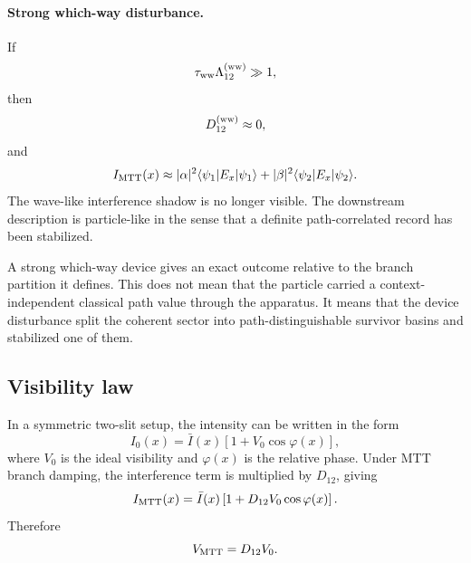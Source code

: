 \documentclass[11pt]{article}
\begin{document}
\paragraph{Strong which-way disturbance.}
If
\begin{equation}
  \tau_{\rm ww}\Lambda_{12}^{(\rm ww)}\gg1,
\end{equation}
then
\begin{equation}
  D_{12}^{(\rm ww)}\approx0,
\end{equation}
and
\begin{equation}
  I_{\rm MTT}(x)
  \approx
  |\alpha|^2\langle\psi_1|E_x|\psi_1\rangle
  +
  |\beta|^2\langle\psi_2|E_x|\psi_2\rangle.
  \label{eq:double-slit-incoherent-sum}
\end{equation}
The wave-like interference shadow is no longer visible. The downstream description is
particle-like in the sense that a definite path-correlated record has been stabilized.

\begin{remark}
\label{rem:exact-outcome-device-context}
A strong which-way device gives an exact outcome relative to the branch partition it defines.
This does not mean that the particle carried a context-independent classical path value
through the apparatus. It means that the device disturbance split the coherent sector into
path-distinguishable survivor basins and stabilized one of them.
\end{remark}

\subsection{Visibility law}
\label{subsec:visibility-law}

In a symmetric two-slit setup, the intensity can be written in the form
\begin{equation}
  I_0(x)
  =
  \bar I(x)\left[1+V_0\cos\varphi(x)\right],
  \label{eq:ideal-visibility-form}
\end{equation}
where \(V_0\) is the ideal visibility and \(\varphi(x)\) is the relative phase. Under MTT branch
damping, the interference term is multiplied by \(D_{12}\), giving
\begin{equation}
  I_{\rm MTT}(x)
  =
  \bar I(x)\left[1+D_{12}V_0\cos\varphi(x)\right].
  \label{eq:mtt-visibility-form}
\end{equation}
Therefore
\begin{equation}
  V_{\rm MTT}
  =
  D_{12}V_0.
  \label{eq:visibility-law}
\end{equation}
\end{document}
